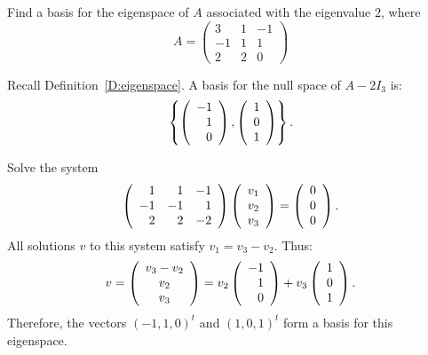 \documentclass{ximera}
\begin{document}
\begin{exercise} \label{c10.2.2}
Find a basis for the eigenspace of $A$ associated with the eigenvalue $2$, where  
\[
A = \left(\begin{array}{rrr} 3 & 1 & -1 \\ -1 & 1 & 1 \\ 2 & 2 & 0 
\end{array}\right)
\]

\begin{solution}

\ans  Recall Definition~\ref{D:eigenspace}. A basis for the null space of $A-2I_3$ is:
\[
\left\{\left(\begin{array}{r} -1 \\ 1 \\ 0\end{array}\right), \left(\begin{array}{r} 1 \\ 0 \\ 1\end{array}\right)\right\}.
\]

\soln Solve the system
\[
\left(\begin{array}{rrr} 1 & 1 & -1 \\ -1 & -1 & 1 \\ 2 & 2 & -2\end{array}\right)\left(\begin{array}{r} v_1 \\ v_2 \\ v_3\end{array}\right) =
\left(\begin{array}{r} 0 \\ 0 \\ 0\end{array}\right).
\]
All solutions $v$ to this system satisfy $v_1 = v_3 - v_2$.  Thus:
\[
v = \left(\begin{array}{c} v_3 - v_2 \\ v_2 \\ v_3\end{array}\right) = v_2\left(\begin{array}{r} -1 \\ 1 \\ 0\end{array}\right) +
v_3\left(\begin{array}{r} 1 \\ 0 \\ 1\end{array}\right).
\]
Therefore, the vectors $(-1,1,0)^t$ and $(1,0,1)^t$ form a basis
for this eigenspace.

\end{solution}
\end{exercise}
\end{document}
